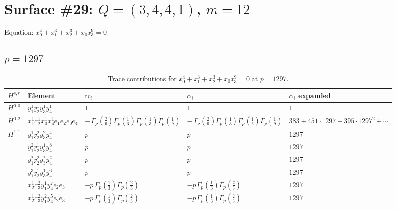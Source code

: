 \documentclass[11pt]{article}
\begin{document}
\section*{Surface \#29: $Q=(3, 4, 4, 1)$, $m=12$}

Equation: $x_0^{4} + x_1^{3} + x_2^{3} + x_0 x_3^{9} = 0$

\subsection*{$p = 1297$}

\begin{table}[ht]
\centering
\caption{Trace contributions for $x_0^{4} + x_1^{3} + x_2^{3} + x_0 x_3^{9} = 0$ at $p=1297$.}\label{tab:deformed-29}
\renewcommand{\arraystretch}{1.1}
{\scriptsize
\begin{tabular}{@{}lllll@{}}
\toprule
$H^{s,r}$ & Element & $\mathrm{tc}_i$ & $\alpha_i$ & $\alpha_i$ expanded \\
\midrule
$H^{0,0}$ & $y_{1}^{1} y_{2}^{1} y_{3}^{1} y_{4}^{1}$ & $1$ & $1$ & $1$ \\
\midrule
$H^{0,2}$ & $x_{1}^{1} x_{2}^{1} x_{3}^{1} x_{4}^{1}  e_{1} e_{2} e_{3} e_{4}$ & $- \, \Gamma_p \left( \frac{2}{9} \right) \Gamma_p \left( \frac{1}{3} \right) \Gamma_p \left( \frac{1}{3} \right) \Gamma_p \left( \frac{1}{9} \right)$ & $- \, \Gamma_p \left( \frac{2}{9} \right) \Gamma_p \left( \frac{1}{3} \right) \Gamma_p \left( \frac{1}{3} \right) \Gamma_p \left( \frac{1}{9} \right)$ & $383{+}451{\cdot}1297{+}395{\cdot}1297^{2}{+}\cdots$ \\
\midrule
$H^{1,1}$ & $y_{1}^{1} y_{2}^{2} y_{3}^{2} y_{4}^{4}$ & $p \,$ & $p \,$ & $1297$ \\
 & $y_{1}^{2} y_{2}^{1} y_{3}^{1} y_{4}^{8}$ & $p \,$ & $p \,$ & $1297$ \\
 & $y_{1}^{2} y_{2}^{2} y_{3}^{2} y_{4}^{2}$ & $p \,$ & $p \,$ & $1297$ \\
 & $y_{1}^{3} y_{2}^{1} y_{3}^{1} y_{4}^{6}$ & $p \,$ & $p \,$ & $1297$ \\
 & $x_{2}^{1} x_{3}^{2} y_{1}^{1} y_{4}^{7} e_{2} e_{3}$ & $- p \, \Gamma_p \left( \frac{1}{3} \right) \Gamma_p \left( \frac{2}{3} \right)$ & $- p \, \Gamma_p \left( \frac{1}{3} \right) \Gamma_p \left( \frac{2}{3} \right)$ & $1297$ \\
 & $x_{2}^{1} x_{3}^{2} y_{1}^{2} y_{4}^{5} e_{2} e_{3}$ & $- p \, \Gamma_p \left( \frac{1}{3} \right) \Gamma_p \left( \frac{2}{3} \right)$ & $- p \, \Gamma_p \left( \frac{1}{3} \right) \Gamma_p \left( \frac{2}{3} \right)$ & $1297$ \\

\end{tabular}}
\end{table}
\end{document}
